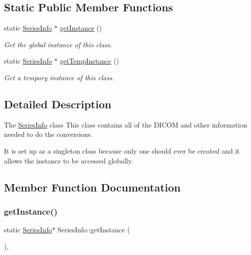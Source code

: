 \subsection*{Static Public Member Functions}
\begin{DoxyCompactItemize}
\item 
static \hyperlink{class_series_info}{Series\+Info} $\ast$ \hyperlink{class_series_info_a1563e01e8605ce20c0f81976d7e729b4}{get\+Instance} ()
\begin{DoxyCompactList}\small\item\em Get the global instance of this class. \end{DoxyCompactList}\item 
static \hyperlink{class_series_info}{Series\+Info} $\ast$ \hyperlink{class_series_info_a8895ba10eb144998e6d15d57524f8ec1}{get\+Temp\+Instance} ()
\begin{DoxyCompactList}\small\item\em Get a tempory instance of this class. \end{DoxyCompactList}\end{DoxyCompactItemize}


\subsection{Detailed Description}
The \hyperlink{class_series_info}{Series\+Info} class This class contains all of the D\+I\+C\+OM and other information needed to do the conversions. 

It is set up as a singleton class because only one should ever be created and it allows the instance to be accessed globally. 

\subsection{Member Function Documentation}
\mbox{\label{class_series_info_a1563e01e8605ce20c0f81976d7e729b4}} 
\subsubsection{\texorpdfstring{get\+Instance()}{getInstance()}}
{\footnotesize\ttfamily static \hyperlink{class_series_info}{Series\+Info}$\ast$ Series\+Info\+::get\+Instance (\begin{DoxyParamCaption}{ }\end{DoxyParamCaption})\hspace{0.3cm}{\ttfamily [inline]}, {\ttfamily [static]}}



